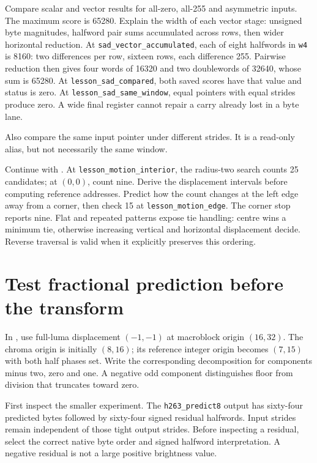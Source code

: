 Compare scalar and vector results for all-zero, all-255 and asymmetric inputs.
The maximum score is 65280. Explain the width of each vector stage: unsigned byte
magnitudes, halfword pair sums accumulated across rows, then wider horizontal
reduction.
At \texttt{sad\_vector\_accumulated}, each of eight halfwords in
\texttt{w4} is 8160: two differences per row, sixteen rows, each difference 255.
Pairwise reduction then gives four words of 16320 and two doublewords of 32640,
whose sum is 65280. At \texttt{lesson\_sad\_compared}, both saved scores have
that value and status is zero. At \texttt{lesson\_sad\_same\_window}, equal
pointers with equal strides produce zero. A wide final register cannot repair a
carry already lost in a byte lane.


Also compare the same input pointer under different strides. It is a read-only
alias, but not necessarily the same window.

Continue with . At
\texttt{lesson\_motion\_interior}, the radius-two search counts 25 candidates; at $(0,0)$,
count nine. Derive the displacement intervals before computing reference
addresses. Predict how the count changes at the left edge away from a corner, then check
15 at \texttt{lesson\_motion\_edge}. The corner stop reports nine.
Flat and repeated patterns expose tie handling: centre wins a minimum tie,
otherwise increasing vertical and horizontal displacement decide. Reverse
traversal is valid when it explicitly preserves this ordering.

\section{Test fractional prediction before the transform}

In , use full-luma displacement $(-1,-1)$ at macroblock origin $(16,32)$. The chroma
origin is initially $(8,16)$; its reference integer origin becomes $(7,15)$ with
both half phases set. Write the corresponding decomposition for components minus
two, zero and one. A negative odd component distinguishes floor from division
that truncates toward zero.

First inspect the smaller  experiment.
The \texttt{h263\_predict8} output has sixty-four predicted bytes followed by
sixty-four signed residual halfwords. Input strides remain independent of those
tight output strides. Before inspecting a residual, select the correct native
byte order and signed halfword interpretation. A negative residual is not a large
positive brightness value.

